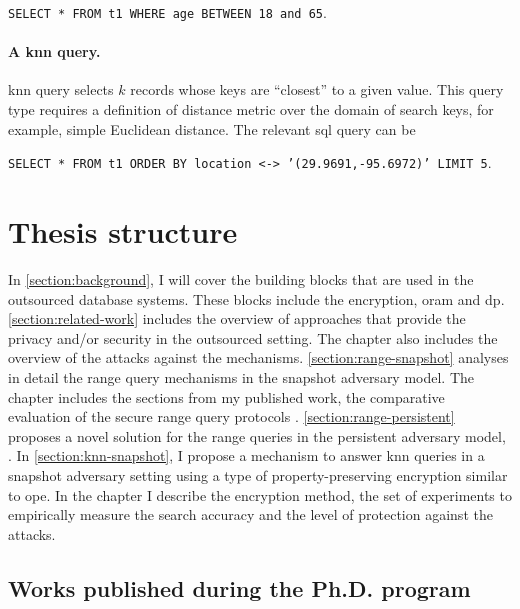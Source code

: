 				\texttt{SELECT * FROM t1 WHERE age BETWEEN 18 and 65}.

			\paragraph*{A \acrshort{knn} query.}
				\acrlong{knn} query selects $k$ records whose keys are ``closest'' to a given value.
				This query type requires a definition of distance metric over the domain of search keys, for example, simple Euclidean distance.
				The relevant \acrshort{sql} query can be

				\texttt{SELECT * FROM t1 ORDER BY location <-> '(29.9691,-95.6972)' LIMIT 5}. %

	\section{Thesis structure}

		In \cref{section:background}, I will cover the building blocks that are used in the outsourced database systems.
		These blocks include the encryption, \acrshort{oram} and \acrlong{dp}.
		\cref{section:related-work} includes the overview of approaches that provide the privacy and/or security in the outsourced setting.
		The chapter also includes the overview of the attacks against the mechanisms.
		\cref{section:range-snapshot} analyses in detail the range query mechanisms in the snapshot adversary model.
		The chapter includes the sections from my published work, the comparative evaluation of the secure range query protocols \cite{ore-benchmark-17}.
		\cref{section:range-persistent} proposes a novel solution for the range queries in the persistent adversary model, \epsolute{} \cite{ore-benchmark-17}.
		In \cref{section:knn-snapshot}, I propose a mechanism to answer \acrlong{knn} queries in a snapshot adversary setting using a type of property-preserving encryption similar to \acrshort{ope}.
		In the chapter I describe the encryption method, the set of experiments to empirically measure the search accuracy and the level of protection against the attacks.

		\subsection{Works published during the Ph.D. program}

			\newlength{\citationLength}
			\begin{description}[
				leftmargin=\dimexpr\citationLength+1.0em\relax,
				labelindent=0pt,
				labelwidth=\citationLength%
			]
				\item[\cite{ore-benchmark-17}] 
				\item[\cite{epsolute}] 
				\item[\cite{bogatov-idemix-2020}] 
				\item[\cite{dispot}] 
			\end{description}
